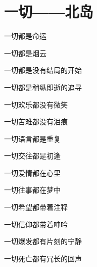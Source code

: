 \section{一切——北岛}
一切都是命运

一切都是烟云

一切都是没有结局的开始

一切都是稍纵即逝的追寻

一切欢乐都没有微笑

一切苦难都没有泪痕

一切语言都是重复

一切交往都是初逢

一切爱情都在心里

一切往事都在梦中

一切希望都带着注释

一切信仰都带着呻吟

一切爆发都有片刻的宁静

一切死亡都有冗长的回声
